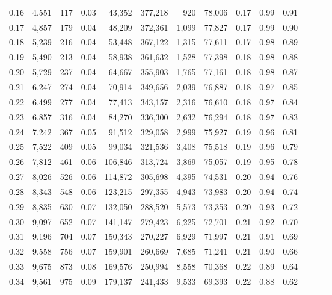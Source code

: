 \begin{tabular}{rrrrrrrrrrrrrr}
0.16 &  4,551 &    117 &  0.03 &   43,352 &  377,218 &     920 &  78,006 &  0.17 &  0.99 &      0.91 \\
0.17 &  4,857 &    179 &  0.04 &   48,209 &  372,361 &   1,099 &  77,827 &  0.17 &  0.99 &      0.90 \\
0.18 &  5,239 &    216 &  0.04 &   53,448 &  367,122 &   1,315 &  77,611 &  0.17 &  0.98 &      0.89 \\
0.19 &  5,490 &    213 &  0.04 &   58,938 &  361,632 &   1,528 &  77,398 &  0.18 &  0.98 &      0.88 \\
0.20 &  5,729 &    237 &  0.04 &   64,667 &  355,903 &   1,765 &  77,161 &  0.18 &  0.98 &      0.87 \\
0.21 &  6,247 &    274 &  0.04 &   70,914 &  349,656 &   2,039 &  76,887 &  0.18 &  0.97 &      0.85 \\
0.22 &  6,499 &    277 &  0.04 &   77,413 &  343,157 &   2,316 &  76,610 &  0.18 &  0.97 &      0.84 \\
0.23 &  6,857 &    316 &  0.04 &   84,270 &  336,300 &   2,632 &  76,294 &  0.18 &  0.97 &      0.83 \\
0.24 &  7,242 &    367 &  0.05 &   91,512 &  329,058 &   2,999 &  75,927 &  0.19 &  0.96 &      0.81 \\
0.25 &  7,522 &    409 &  0.05 &   99,034 &  321,536 &   3,408 &  75,518 &  0.19 &  0.96 &      0.79 \\
0.26 &  7,812 &    461 &  0.06 &  106,846 &  313,724 &   3,869 &  75,057 &  0.19 &  0.95 &      0.78 \\
0.27 &  8,026 &    526 &  0.06 &  114,872 &  305,698 &   4,395 &  74,531 &  0.20 &  0.94 &      0.76 \\
0.28 &  8,343 &    548 &  0.06 &  123,215 &  297,355 &   4,943 &  73,983 &  0.20 &  0.94 &      0.74 \\
0.29 &  8,835 &    630 &  0.07 &  132,050 &  288,520 &   5,573 &  73,353 &  0.20 &  0.93 &      0.72 \\
0.30 &  9,097 &    652 &  0.07 &  141,147 &  279,423 &   6,225 &  72,701 &  0.21 &  0.92 &      0.70 \\
0.31 &  9,196 &    704 &  0.07 &  150,343 &  270,227 &   6,929 &  71,997 &  0.21 &  0.91 &      0.69 \\
0.32 &  9,558 &    756 &  0.07 &  159,901 &  260,669 &   7,685 &  71,241 &  0.21 &  0.90 &      0.66 \\
0.33 &  9,675 &    873 &  0.08 &  169,576 &  250,994 &   8,558 &  70,368 &  0.22 &  0.89 &      0.64 \\
0.34 &  9,561 &    975 &  0.09 &  179,137 &  241,433 &   9,533 &  69,393 &  0.22 &  0.88 &      0.62 \\

\end{tabular}
